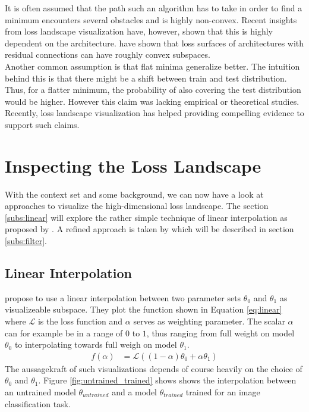 \documentclass[a4paper]{scrartcl}
\begin{document}
It is often assumed that the path such an algorithm has to take in order to find a minimum encounters several obstacles and is highly non-convex. Recent insights from loss landscape visualization have, however, shown that this is highly dependent on the architecture. \cite{li2017visualizing} have shown that loss surfaces of architectures with residual connections can have roughly convex subspaces.\\
Another common assumption is that flat minima generalize better. The intuition behind this is that there might be a shift between train and test distribution. Thus, for a flatter minimum, the probability of also covering the test distribution would be higher. However this claim was lacking empirical or theoretical studies. Recently, loss landscape visualization has helped providing compelling evidence to support such claims.



\section*{Inspecting the Loss Landscape}
With the context set and some background, we can now have a look at approaches to visualize the high-dimensional loss landscape. The section \ref{subs:linear} will explore the rather simple technique of linear interpolation as proposed by \cite{goodfellow2014qualitatively}. A refined approach is taken by \cite{li2017visualizing} which will be described in section \ref{subs:filter}.


\label{subs:linear}
\subsection*{Linear Interpolation}
\cite{goodfellow2014qualitatively} propose to use a linear interpolation between two parameter sets $\theta_0$ and $\theta_1$ as visualizeable subspace. They plot the function shown in Equation \ref{eq:linear} where $\mathcal{L}$ is the loss function and $\alpha$ serves as weighting parameter. The scalar $\alpha$ can for example be in a range of $0$ to $1$, thus ranging from full weight on model $\theta_0$ to interpolating towards full weigh on model $\theta_1$.
\label{eq:linear}
\begin{align}
	f(\alpha) &= \mathcal{L}((1-\alpha) \theta_0 + \alpha \theta_1)
\end{align}
The aussagekraft of such visualizations depends of course heavily on the choice of $\theta_0$ and $\theta_1$. Figure \ref{fig:untrained_trained} shows shows the interpolation between an untrained model $\theta_{untrained}$ and a model $\theta_{trained}$ trained for an image classification task.
\end{document}
